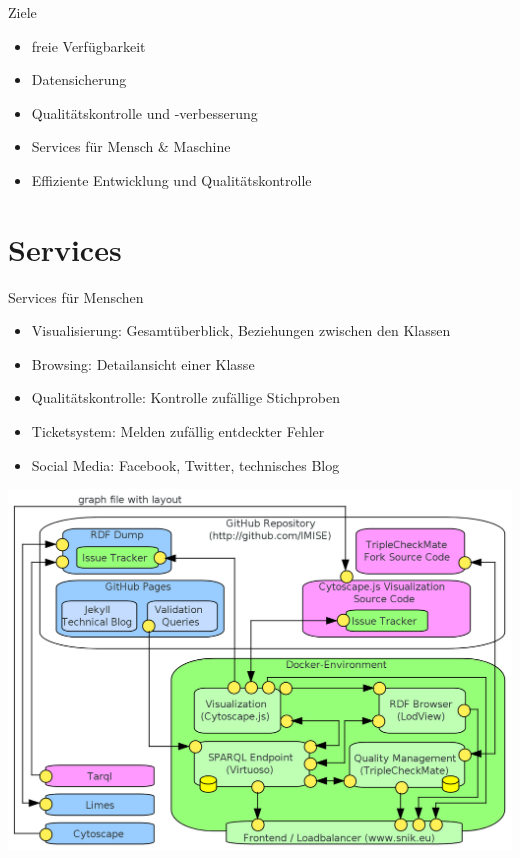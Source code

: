 \documentclass{beamer}
\begin{document}
\begin{frame}{Ziele}
\begin{itemize}
\item freie Verfügbarkeit
\item Datensicherung
\item Qualitätskontrolle und -verbesserung
\pause
\item Services für Mensch \& Maschine
\item Effiziente Entwicklung und Qualitätskontrolle
\end{itemize}
\end{frame}

\section{Services}
\begin{frame}{Services für Menschen}
\begin{itemize}
\item Visualisierung: Gesamtüberblick, Beziehungen zwischen den Klassen
\item Browsing: Detailansicht einer Klasse
\item Qualitätskontrolle: Kontrolle zufällige Stichproben
\item Ticketsystem: Melden zufällig entdeckter Fehler 
\item Social Media: Facebook, Twitter, technisches Blog
\end{itemize}
\end{frame}

\begin{frame}
\includegraphics[width=\textwidth]{img/architecture.png}
\end{frame}
\end{document}
